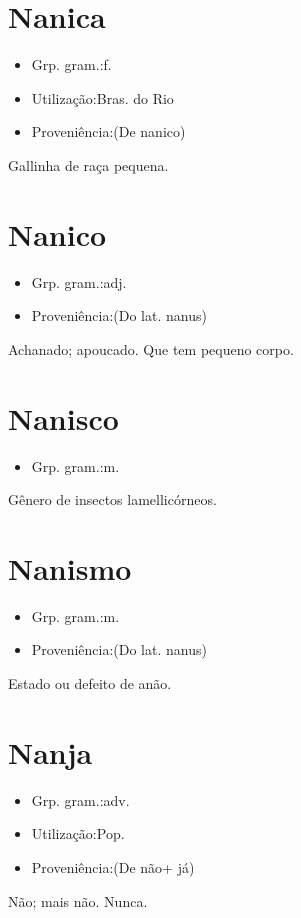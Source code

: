 \section{Nanica}
\begin{itemize}
\item {Grp. gram.:f.}
\end{itemize}
\begin{itemize}
\item {Utilização:Bras. do Rio}
\end{itemize}
\begin{itemize}
\item {Proveniência:(De \textunderscore nanico\textunderscore )}
\end{itemize}
Gallinha de raça pequena.
\section{Nanico}
\begin{itemize}
\item {Grp. gram.:adj.}
\end{itemize}
\begin{itemize}
\item {Proveniência:(Do lat. \textunderscore nanus\textunderscore )}
\end{itemize}
Achanado; apoucado.
Que tem pequeno corpo.
\section{Nanisco}
\begin{itemize}
\item {Grp. gram.:m.}
\end{itemize}
Gênero de insectos lamellicórneos.
\section{Nanismo}
\begin{itemize}
\item {Grp. gram.:m.}
\end{itemize}
\begin{itemize}
\item {Proveniência:(Do lat. \textunderscore nanus\textunderscore )}
\end{itemize}
Estado ou defeito de anão.
\section{Nanja}
\begin{itemize}
\item {Grp. gram.:adv.}
\end{itemize}
\begin{itemize}
\item {Utilização:Pop.}
\end{itemize}
\begin{itemize}
\item {Proveniência:(De \textunderscore não\textunderscore  + \textunderscore já\textunderscore )}
\end{itemize}
Não; mais não.
Nunca.
